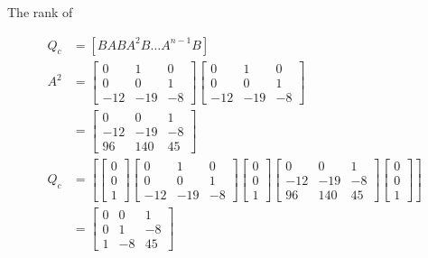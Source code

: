 \documentclass[main.tex]{subfiles}
\begin{document}
\begin{enumerate}
\begin{enumerate}
        The rank of
        
        $$
        \begin{aligned}  
        Q_c &= \left[B A B A^2 B \ldots A^{n-1} B\right]\\
        A^2 & = \left[\begin{array}{ccc}
        0 & 1 & 0 \\
        0 & 0 & 1 \\
        -12 & -19 & -8
        \end{array}\right] \left[\begin{array}{ccc}
        0 & 1 & 0 \\
        0 & 0 & 1 \\
        -12 & -19 & -8
        \end{array}\right] \\
        & = \left[\begin{array}{ccc}
        0 & 0 & 1 \\
        -12 & -19 & -8 \\
        96 & 140 & 45
        \end{array}\right]\\
        Q_c &= \left[\left[\begin{array}{l}
        0 \\
        0 \\
        1
        \end{array}\right] \left[\begin{array}{ccc}
        0 & 1 & 0 \\
        0 & 0 & 1 \\
        -12 & -19 & -8
        \end{array}\right] \left[\begin{array}{l}
        0 \\
        0 \\
        1
        \end{array}\right] \left[\begin{array}{ccc}
        0 & 0 & 1 \\
        -12 & -19 & -8 \\
        96 & 140 & 45
        \end{array}\right] \left[\begin{array}{l}
        0 \\
        0 \\
        1
        \end{array}\right] \right]\\
        & = \left[\begin{array}{ccc}
        0 & 0 & 1 \\
        0 & 1 & -8 \\
        1 & -8 & 45
        \end{array}\right]
        \end{aligned}
        $$
        

\end{enumerate}
\end{enumerate}
\end{document}
